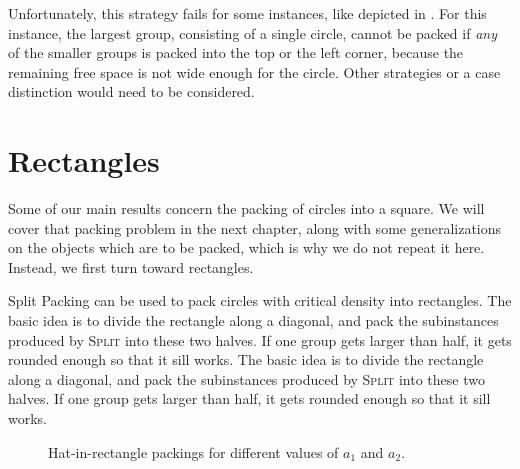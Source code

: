 \documentclass[a4paper,style=print,bibliography=totoc,nexus,lnum,extramargin]{tubsbook}
\begin{document}
Unfortunately, this strategy fails for some instances, like depicted in . For this instance, the largest group, consisting of a single circle, cannot be packed if \emph{any} of the smaller groups is packed into the top or the left corner, because the remaining free space is not wide enough for the circle. Other strategies or a case distinction would need to be considered.


\section{Rectangles}\label{sec:rectangles}

Some of our main results concern the packing of circles into a square. We will cover that packing problem in the next chapter, along with some generalizations on the objects which are to be packed, which is why we do not repeat it here. Instead, we first turn toward rectangles.

Split Packing can be used to pack circles with critical density into rectangles. The basic idea is to divide the rectangle along a diagonal, and pack the subinstances produced by \textsc{Split} into these two halves. If one group gets larger than half, it gets rounded enough so that it sill works. The basic idea is to divide the rectangle along a diagonal, and pack the subinstances produced by \textsc{Split} into these two halves. If one group gets larger than half, it gets rounded enough so that it sill works.

\begin{figure}

    \vspace{5mm}


    \caption{Hat-in-rectangle packings for different values of $a_1$ and $a_2$.}
    \label{fig:hats-in-rect}
\end{figure}
\end{document}
